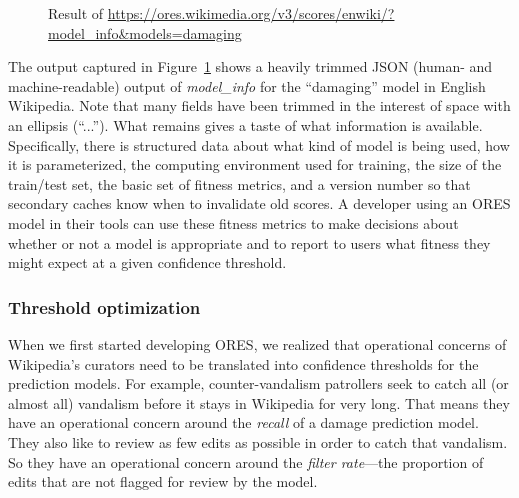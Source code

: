 \begin{figure}[htbp]
        \caption{Result of \url{https://ores.wikimedia.org/v3/scores/enwiki/?model_info&models=damaging}}
        \label{fig:english_damaging_model_info}
\end{figure}

The output captured in Figure~\ref{fig:english_damaging_model_info} shows a heavily trimmed JSON (human- and machine-readable) output of \emph{model\_info} for the ``damaging'' model in English Wikipedia.  Note that many fields have been trimmed in the interest of space with an ellipsis (``...'').  What remains gives a taste of what information is available.  Specifically, there is structured data about what kind of model is being used, how it is parameterized, the computing environment used for training, the size of the train/test set, the basic set of fitness metrics, and a version number so that secondary caches know when to invalidate old scores.  A developer using an ORES model in their tools can use these fitness metrics to make decisions about whether or not a model is appropriate and to report to users what fitness they might expect at a given confidence threshold.

\subsubsection{Threshold optimization}
\label{sec:appendix.threshold_optimization}
When we first started developing ORES, we realized that operational concerns of Wikipedia's curators need to be translated into confidence thresholds for the prediction models.  For example, counter-vandalism patrollers seek to catch all (or almost all) vandalism before it stays in Wikipedia for very long.  That means they have an operational concern around the \emph{recall} of a damage prediction model.  They also like to review as few edits as possible in order to catch that vandalism.  So they have an operational concern around the \emph{filter rate}---the proportion of edits that are not flagged for review by the model\cite{halfaker2016notes}.

